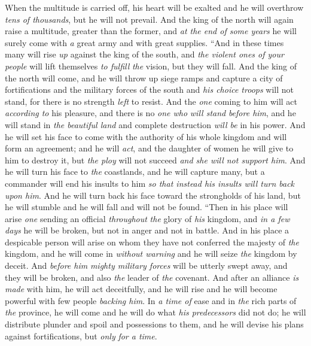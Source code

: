 \begin{biblechapter}
\verse When the multitude is carried off, his heart will be exalted and he will overthrow \textit{tens of thousands}, but he will not prevail.
\verse And the king of the north will again raise a multitude, greater than the former, and \textit{at the end of some years} he will surely come with \textit{a} great army and with great supplies.
\verse “And in these times many will rise \textit{up} against the king of the south, and \textit{the violent ones of your people} will lift themselves \textit{to fulfill} \textit{the} vision, but they will fall.
\verse And the king of the north will come, and he will throw up siege ramps and capture a city of fortifications and the military forces of the south and \textit{his choice troops} will not stand, for there is no strength \textit{left} to resist.
\verse And the \textit{one} coming to him will act \textit{according to} his pleasure, and there is no \textit{one who} \textit{will stand} \textit{before him}, and he will stand in \textit{the beautiful land} and complete destruction \textit{will be} in his power.
\verse And he will set his face to come with the authority of his whole kingdom and will form an agreement; and he will \textit{act}, and the daughter of women he will give to him to destroy it, but \textit{the ploy} will not succeed \textit{and she will not support him}.
\verse And he will turn his face to \textit{the} coastlands, and he will capture many, but a commander will end his insults to him \textit{so that instead his insults will turn back upon him}.
\verse And he will turn back his face toward the strongholds of his land, but he will stumble and he will fall and will not be found.
\verse “Then in his place will arise \textit{one} sending an official \textit{throughout} \textit{the} glory of \textit{his} kingdom, and \textit{in a few days} he will be broken, but not in anger and not in battle.
\verse And in his place a despicable person will arise on whom they have not conferred the majesty of \textit{the} kingdom, and he will come in \textit{without warning} and he will seize \textit{the} kingdom by deceit.
\verse And \textit{before him} \textit{mighty military forces} will be utterly swept away, and they will be broken, and also \textit{the} leader of \textit{the} covenant.
\verse And after an alliance \textit{is made} with him, he will act deceitfully, and he will rise and he will become powerful with few people \textit{backing him}.
\verse In \textit{a time of} ease and in \textit{the} rich parts of \textit{the} province, he will come and he will do what \textit{his predecessors} did not do; he will distribute plunder and spoil and possessions to them, and he will devise his plans against fortifications, but \textit{only} \textit{for a time}.

\end{biblechapter}
